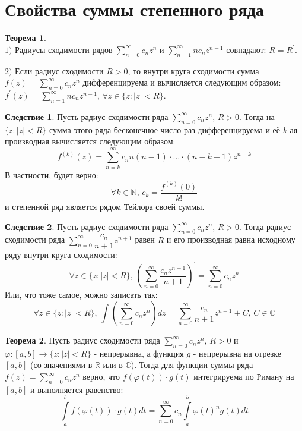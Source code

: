\documentclass[12pt]{article}
\newcommand{\RN}[1]{%
	\textup{\uppercase\expandafter{\romannumeral#1}}%
}
\newcommand{\MR}{\mathbb{R}}
\newcommand{\MC}{\mathbb{C}}
\newcommand{\MN}{\mathbb{N}}
\theoremstyle{definition}
\newtheorem{theorem}{Теорема}
\newtheorem{corollary}{Следствие}
\newcommand{\ddsum}[2]{\displaystyle\sum\limits_{#1}^{#2}}
\newcommand{\ddint}[2]{\displaystyle\int\limits_{#1}^{#2}}
\begin{document}
\lhead{Математический анализ - \RN{3}}
\section*{Свойства суммы степенного ряда}
\begin{theorem}\hfill\\
	$1)$ Радиусы сходимости рядов $\ddsum{n = 0}{\infty}c_n z^n$ и $\ddsum{n = 		1}{\infty}n c_n z^{n-1}$ совпадают: $R = R^\prime$.
	
	$2)$ Если радиус сходимости $R > 0$, то внутри круга сходимости сумма $f(z) = \ddsum{n = 0}{\infty}c_n z^n$  дифференцируема и вычисляется следующим образом: $f^\prime(z) = \ddsum{n = 1}{\infty}nc_n z^{n-1}, \, \forall z \in \{z \colon |z| < R\}$.
\end{theorem}
\begin{corollary}
	Пусть радиус сходимости ряда $\ddsum{n = 0}{\infty}c_n z^n$, $R > 0$. Тогда на $\{z \colon |z| < R \}$ сумма этого ряда бесконечное число раз дифференцируема и её $k$-ая производная вычисляется следующим образом:
	$$
		f^{(k)}(z) = \ddsum{ n = k}{\infty}c_n n(n - 1){\cdot}\dotsc {\cdot}(n - k + 1)z^{n - k}
	$$
	В частности, будет верно:
	$$
		\forall k \in \MN, \, c_k = \dfrac{f^{(k)}(0)}{k!} 
	$$
	и степенной ряд является рядом Тейлора своей суммы.
\end{corollary}
\begin{corollary}
	Пусть радиус сходимости ряда $\ddsum{n = 0}{\infty}c_n z^n$, $R > 0$. Тогда радиус сходимости ряда $\ddsum{n = 0}{\infty}\dfrac{c_n}{n+ 1}z^{n+1}$
	равен $R$ и его производная равна исходному ряду внутри круга сходимости:
	$$
		\forall z \in \{z \colon |z| < R\},\, \left(\ddsum{n = 0}{\infty}\dfrac{c_n z^{n+1}}{n + 1}\right)^\prime = \ddsum{n = 0}{\infty}c_n z^n
	$$
	Или, что тоже самое, можно записать так:
	$$
		\forall z \in \{z \colon |z| < R\}, \, \int \left(\ddsum{n = 0}{\infty}c_n z^n \right)dz = \ddsum{n = 0}{\infty}\dfrac{c_n}{n + 1} z^{n+1} + C, \, C \in \MC
	$$
\end{corollary}
\begin{theorem}
	Пусть радиус сходимости ряда $\ddsum{n = 0}{\infty}c_n z^n$, $R > 0$ и $\varphi \colon [a,b] \to \{z\colon |z| < R\}$ - непрерывна, а функция $g$ - непрерывна на отрезке $[a,b]$ (со значениями в $\MR$ или в $\MC$). Тогда для функции суммы ряда $f(z) = \ddsum{n = 0}{\infty}c_n z^n$ верно, что $f\left(\varphi(t)\right){\cdot}g(t)$ интегрируема по Риману на $[a,b]$ и выполняется равенство:
	$$
		\ddint{a}{b}f\left(\varphi(t)\right){\cdot}g(t)dt = \ddsum{n = 0}{\infty}c_n \ddint{a}{b}\varphi(t)^ng(t)dt
	$$
\end{theorem}
\end{document}
